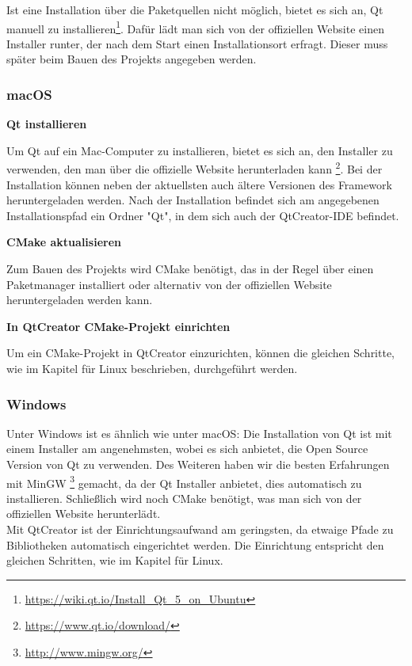 Ist eine Installation über die Paketquellen nicht möglich, bietet es sich an, Qt manuell
zu installieren\footnote{\url{https://wiki.qt.io/Install_Qt_5_on_Ubuntu}}. Dafür lädt
man sich von der offiziellen Website einen Installer runter, der nach dem Start einen
Installationsort erfragt. Dieser muss später beim Bauen des Projekts angegeben werden.



\subsubsection{macOS}

\textbf{Qt installieren}

Um Qt auf ein Mac-Computer zu installieren, bietet es sich an, den Installer zu
verwenden, den man über die offizielle Website herunterladen kann
\footnote{\url{https://www.qt.io/download/}}. Bei der Installation können neben der
aktuellsten auch ältere Versionen des Framework heruntergeladen werden. Nach
der Installation befindet sich am angegebenen Installationspfad ein Ordner "Qt",
in dem sich auch der QtCreator-IDE befindet.

\textbf{CMake aktualisieren}

Zum Bauen des Projekts wird CMake benötigt, das in der Regel über einen
Paketmanager installiert oder alternativ von der offiziellen Website
heruntergeladen werden kann.

\textbf{In QtCreator CMake-Projekt einrichten}

Um ein CMake-Projekt in QtCreator einzurichten, können die gleichen Schritte, wie
im Kapitel für Linux beschrieben, durchgeführt werden.

\subsubsection{Windows}

Unter Windows ist es ähnlich wie unter macOS: Die Installation von Qt ist mit
einem Installer am angenehmsten, wobei es sich anbietet, die Open Source Version
von Qt zu verwenden. Des Weiteren haben wir die besten Erfahrungen mit MinGW
\footnote{\url{http://www.mingw.org/}} gemacht, da der Qt Installer anbietet,
dies automatisch zu installieren. Schließlich wird noch CMake benötigt, was man
sich von der offiziellen Website herunterlädt. \\
Mit QtCreator ist der Einrichtungsaufwand am geringsten, da etwaige Pfade zu
Bibliotheken automatisch eingerichtet werden. Die Einrichtung entspricht den
gleichen Schritten, wie im Kapitel für Linux.

